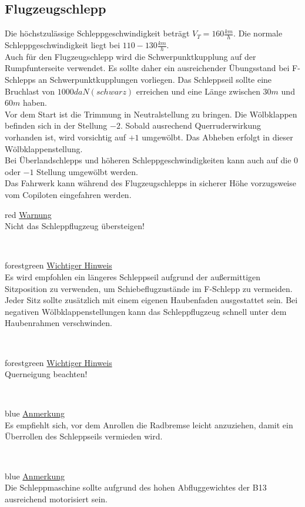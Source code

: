 \subsection{Flugzeugschlepp}
Die höchstzulässige Schleppgeschwindigkeit beträgt $V_T=160 \frac{km}{h}$. Die normale Schleppgeschwindigkeit liegt bei $110-130 \frac{km}{h}$. \\
Auch für den Flugzeugschlepp wird die Schwerpunktkupplung auf der Rumpfunterseite verwendet. Es sollte daher ein ausreichender Übungsstand bei F-Schlepps an Schwerpunktkupplungen vorliegen. Das Schleppseil sollte eine Bruchlast von $1000 daN (schwarz)$ erreichen und eine Länge zwischen $30m$ und $60m$ haben.\\
Vor dem Start ist die Trimmung in Neutralstellung zu bringen. Die Wölbklappen befinden sich in der Stellung $-2$. Sobald ausrechend Querruderwirkung vorhanden ist, wird vorsichtig auf $+1$ umgewölbt. Das Abheben erfolgt in dieser Wölbklappenstellung. \\
Bei Überlandschlepps und höheren Schleppgeschwindigkeiten kann auch auf die $0$ oder  $-1$ Stellung umgewölbt werden.\\
Das Fahrwerk kann während des Flugzeugschlepps in sicherer Höhe vorzugsweise vom Copiloten eingefahren werden.\\
\newline
\begin{color}{red}
\large{\underline{Warnung}}\\
Nicht das Schleppflugzeug übersteigen!
\end{color}\\
\newline
\begin{color}{forestgreen}
\large{\underline{Wichtiger Hinweis}}\\
Es wird empfohlen ein längeres Schleppseil aufgrund der außermittigen Sitzposition zu verwenden, um Schiebeflugzustände im F-Schlepp zu 	vermeiden. Jeder Sitz sollte zusätzlich mit einem eigenen Haubenfaden ausgestattet sein. Bei negativen Wölbklappenstellungen kann das Schleppflugzeug schnell unter dem Haubenrahmen verschwinden.
\end{color}\\
\newline
\begin{color}{forestgreen}
\large{\underline{Wichtiger Hinweis}}\\
Querneigung beachten!
\end{color}\\
\newline
\begin{color}{blue}
\large{\underline{Anmerkung}}\\
Es empfiehlt sich, vor dem Anrollen die Radbremse leicht anzuziehen, damit ein	Überrollen des Schleppseils vermieden wird. 
\end{color}\\
\begin{color}{blue}
\large{\underline{Anmerkung}}\\
Die Schleppmaschine sollte aufgrund des hohen Abfluggewichtes der B13 ausreichend motorisiert sein.
\end{color}\\

